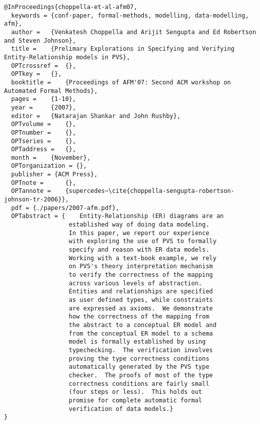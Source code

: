 \documentclass[11pt]{article}
\begin{document}
\begin{lstlisting}
@InProceedings{choppella-et-al-afm07,
  keywords = {conf-paper, formal-methods, modelling, data-modelling, afm},
  author = 	 {Venkatesh Choppella and Arijit Sengupta and Ed Robertson and Steven Johnson},
  title = 	 {Prelimary Explorations in Specifying and Verifying Entity-Relationship models in PVS},
  OPTcrossref =  {},
  OPTkey = 	 {},
  booktitle =    {Proceedings of AFM'07: Second ACM workshop on Automated Formal Methods},
  pages = 	 {1-10},
  year = 	 {2007},
  editor = 	 {Natarajan Shankar and John Rushby},
  OPTvolume = 	 {},
  OPTnumber = 	 {},
  OPTseries = 	 {},
  OPTaddress = 	 {},
  month = 	 {November},
  OPTorganization = {},
  publisher = {ACM Press},
  OPTnote = 	 {},
  OPTannote = 	 {supercedes~\cite{choppella-sengupta-robertson-johnson-tr-2006}},
  pdf = {./papers/2007-afm.pdf},
  OPTabstract = {    Entity-Relationship (ER) diagrams are an
                  established way of doing data modeling.
                  In this paper, we report our experience
                  with exploring the use of PVS to formally
                  specify and reason with ER data models.
                  Working with a text-book example, we rely
                  on PVS's theory interpretation mechanism
                  to verify the correctness of the mapping
                  across various levels of abstraction.
                  Entities and relationships are specified
                  as user defined types, while constraints
                  are expressed as axioms.  We demonstrate
                  how the correctness of the mapping from
                  the abstract to a conceptual ER model and
                  from the conceptual ER model to a schema
                  model is formally established by using
                  typechecking.  The verification involves
                  proving the type correctness conditions
                  automatically generated by the PVS type
                  checker.  The proofs of most of the type
                  correctness conditions are fairly small
                  (four steps or less).  This holds out
                  promise for complete automatic formal
                  verification of data models.}
}


\end{lstlisting}
\end{document}
